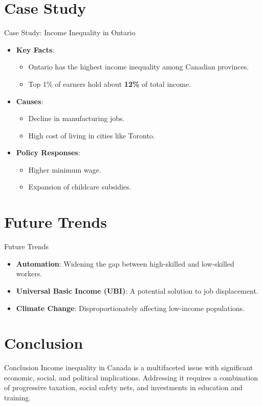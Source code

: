 \documentclass{beamer}
\begin{document}
\section{Case Study}

\begin{frame}{Case Study: Income Inequality in Ontario}
\begin{itemize}
    \item \textbf{Key Facts}:
        \begin{itemize}
            \item Ontario has the highest income inequality among Canadian provinces.
            \item Top 1\% of earners hold about \textbf{12\%} of total income.
        \end{itemize}
    \item \textbf{Causes}:
        \begin{itemize}
            \item Decline in manufacturing jobs.
            \item High cost of living in cities like Toronto.
        \end{itemize}
    \item \textbf{Policy Responses}:
        \begin{itemize}
            \item Higher minimum wage.
            \item Expansion of childcare subsidies.
        \end{itemize}
\end{itemize}
\end{frame}

\section{Future Trends}

\begin{frame}{Future Trends}
\begin{itemize}
    \item \textbf{Automation}: Widening the gap between high-skilled and low-skilled workers.
    \item \textbf{Universal Basic Income (UBI)}: A potential solution to job displacement.
    \item \textbf{Climate Change}: Disproportionately affecting low-income populations.
\end{itemize}
\end{frame}

\section{Conclusion}

\begin{frame}{Conclusion}
Income inequality in Canada is a multifaceted issue with significant economic, social, and political implications. Addressing it requires a combination of progressive taxation, social safety nets, and investments in education and training.
\end{frame}
\end{document}
